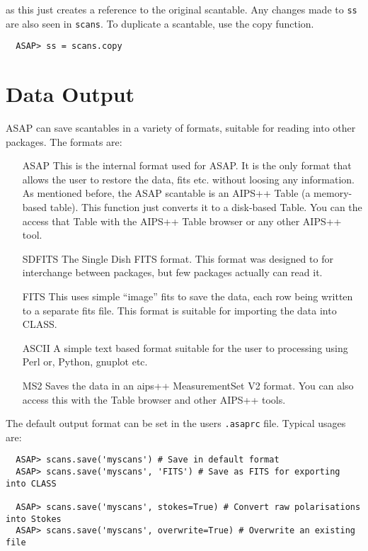 \documentclass[11pt]{article}
\newcommand{\cmd}[1]{{\tt #1}}
\begin{document}
as this just creates a reference to the original scantable. Any
changes made to \cmd{ss} are also seen in \cmd{scans}. To duplicate a
scantable, use the copy function.

\begin{verbatim}
  ASAP> ss = scans.copy
\end{verbatim}

\section{Data Output}

ASAP can save scantables in a variety of formats, suitable for reading
into other packages. The formats are:

\begin{itemize}
\item[ASAP] This is the internal format used for ASAP. It is the only
  format that allows the user to restore the data, fits etc. without
  loosing any information.  As mentioned before, the ASAP scantable is
  an AIPS++ Table (a memory-based table).  This function just converts
  it to a disk-based Table.  You can the access that Table with the
  AIPS++ Table browser or any other AIPS++ tool.

\item[SDFITS] The Single Dish FITS format. This format was designed to
  for interchange between packages, but few packages actually can read
  it.

\item[FITS] This uses simple ``image'' fits to save the data, each row
  being written to a separate fits file. This format is suitable for
  importing the data into CLASS.

\item[ASCII] A simple text based format suitable for the user to
processing using Perl or, Python, gnuplot etc.

\item[MS2] Saves the data in an aips++ MeasurementSet V2 format.
You can also access this with the Table browser and other AIPS++
tools.

\end{itemize}

The default output format can be set in the users {\tt .asaprc} file. 
Typical usages are:

\begin{verbatim}
  ASAP> scans.save('myscans') # Save in default format
  ASAP> scans.save('myscans', 'FITS') # Save as FITS for exporting into CLASS

  ASAP> scans.save('myscans', stokes=True) # Convert raw polarisations into Stokes
  ASAP> scans.save('myscans', overwrite=True) # Overwrite an existing file
\end{verbatim}
\end{document}
